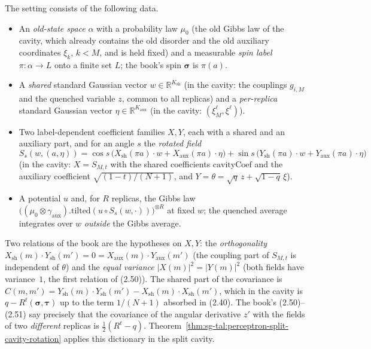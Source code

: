 \begin{remark}\label{rem:sg-tal:perceptron-model-free-setting}
The setting consists of the following data.
\begin{itemize}
\item An \emph{old-state space} $\alpha$ with a probability law $\mu_0$ (the old Gibbs law of the cavity, which already contains the old disorder and the old auxiliary coordinates $\xi_k$, $k<M$,
and is held fixed) and a measurable \emph{spin label} $\pi:\alpha\to L$ onto a finite set $L$; the book's spin $\boldsymbol\sigma$ is $\pi(a)$.
\item A \emph{shared} standard Gaussian vector $w\in\mathbb R^{K_{\mathrm{sh}}}$ (in the cavity: the couplings $g_{i,M}$ and the quenched variable $z$, common to all replicas) and a \emph{per-replica}
standard Gaussian vector $\eta\in\mathbb R^{K_{\mathrm{aux}}}$ (in the cavity: $(\xi_M^\ell,\xi^\ell)$).
\item Two label-dependent coefficient families $X,Y$, each with a shared and an auxiliary part, and for an angle $s$ the \emph{rotated field}
\[
 S_s(w,(a,\eta))=\cos s\,\bigl(X_{\mathrm{sh}}(\pi a)\cdot w+X_{\mathrm{aux}}(\pi a)\cdot\eta\bigr)+\sin s\,\bigl(Y_{\mathrm{sh}}(\pi a)\cdot w+Y_{\mathrm{aux}}(\pi a)\cdot\eta\bigr)
\]
(in the cavity: $X=S_{M,t}$ with the shared coefficients $\mathrm{cavityCoef}$ and the auxiliary coefficient $\sqrt{(1-t)/(N+1)}$, and $Y=\theta=\sqrt q\,z+\sqrt{1-q}\,\xi$).
\item A potential $u$ and, for $R$ replicas, the Gibbs law $\bigl((\mu_0\otimes\gamma_{\mathrm{aux}}).\mathrm{tilted}(u\circ S_s(w,\cdot))\bigr)^{\otimes R}$ at fixed $w$; the quenched average integrates over $w$ \emph{outside} the Gibbs average.
\end{itemize}
Two relations of the book are the hypotheses on $X,Y$: the \emph{orthogonality} $X_{\mathrm{sh}}(m)\cdot Y_{\mathrm{sh}}(m')=0=X_{\mathrm{aux}}(m)\cdot Y_{\mathrm{aux}}(m')$
(the coupling part of $S_{M,t}$ is independent of $\theta$) and the \emph{equal variance} $|X(m)|^2=|Y(m)|^2$ (both fields have variance~$1$, the first relation of (2.50)).
The shared part of the covariance is $C(m,m')=Y_{\mathrm{sh}}(m)\cdot Y_{\mathrm{sh}}(m')-X_{\mathrm{sh}}(m)\cdot X_{\mathrm{sh}}(m')$, which in the cavity is $q-R^t(\boldsymbol\sigma,\boldsymbol\tau)$ up to the term $1/(N+1)$
absorbed in (2.40).
The book's (2.50)--(2.51) say precisely that the covariance of the angular derivative $z'$ with the fields of two \emph{different} replicas is $\tfrac12(R^t-q)$.
Theorem~\ref{thm:sg-tal:perceptron-split-cavity-rotation} applies this dictionary in the split cavity.


\end{remark}
